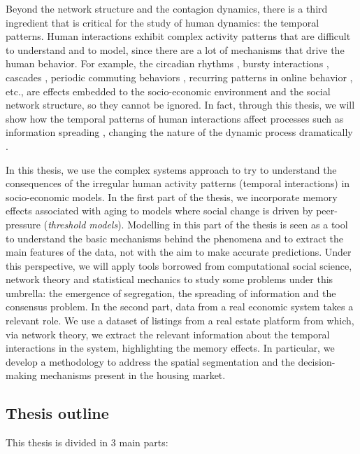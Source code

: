 Beyond the network structure and the contagion dynamics, there is a third ingredient that is critical for the study of human dynamics: the temporal patterns. Human interactions exhibit complex activity patterns that are difficult to understand and to model, since there are a lot of mechanisms that drive the human behavior. For example, the circadian rhythms \cite{roenneberg-2013}, bursty interactions \cite{Barabasi2005Bursts}, cascades \cite{watts-2002}, periodic commuting behaviors \cite{gonzalez2008understanding}, recurring patterns in online behavior \cite{Lazer2009CompSocSci}, etc., are effects embedded to the socio-economic environment and the social network structure, so they cannot be ignored. In fact, through this thesis, we will show how the temporal patterns of human interactions affect processes such as information spreading  \cite{Holme2012Temporal}, changing the nature of the dynamic process dramatically \cite{karsai-2011}.

In this thesis, we use the complex systems approach to try to understand the consequences of the irregular human activity patterns (temporal interactions) in socio-economic models. In the first part of the thesis, we incorporate memory effects associated with aging to models where social change is driven by peer-pressure (\textit{threshold models}). Modelling in this part of the thesis is seen as a tool to understand the basic mechanisms behind the phenomena and to extract the main features of the data, not with the aim to make accurate predictions. Under this perspective, we will apply tools borrowed from computational social science, network theory and statistical mechanics to study some problems under this umbrella: the emergence of segregation, the spreading of information and the consensus problem. In the second part, data from a real economic system takes a relevant role. We use a dataset of listings from a real estate platform from which, via network theory, we extract the relevant information about the temporal interactions in the system, highlighting the memory effects. In particular, we develop a methodology to address the spatial segmentation and the decision-making mechanisms present in the housing market.

\subsection{\label{sec:Thesis outline} Thesis outline}

This thesis is divided in 3 main parts:

